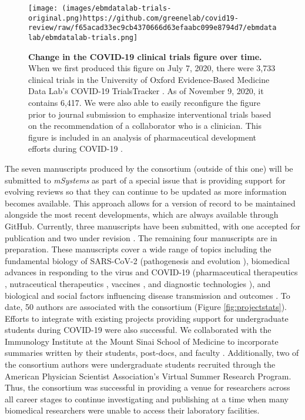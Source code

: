 \documentclass[sigconf]{acmart}
\begin{document}
\begin{figure}
\hypertarget{fig:ebm-trials}{%
\centering
\texttt{[image: (images/ebmdatalab-trials-original.png)https://github.com/greenelab/covid19-review/raw/f65acad33ec9cb4370666d63efaabc099e8794d7/ebmdatalab/ebmdatalab-trials.png]}
\caption{\textbf{Change in the COVID-19 clinical trials figure over time.}
When we first produced this figure on July 7, 2020, there were 3,733 clinical trials in the University of Oxford Evidence-Based Medicine Data Lab's COVID-19 TrialsTracker \citep{SSbnPnzT}.
As of November 9, 2020, it contains 6,417.
We were also able to easily reconfigure the figure prior to journal submission to emphasize interventional trials based on the recommendation of a collaborator who is a clinician.
This figure is included in an analysis of pharmaceutical development efforts during COVID-19 \citep{cifK9B8t}.}\label{fig:ebm-trials}
}
\end{figure}

The seven manuscripts produced by the consortium (outside of this one) will be submitted to \emph{mSystems} as part of a special issue that is providing support for evolving reviews so that they can continue to be updated as more information becomes available.
This approach allows for a version of record to be maintained alongside the most recent developments, which are always available through GitHub.
Currently, three manuscripts have been submitted, with one accepted for publication \citep{1B22G6dja} and two under revision \citep{r366f5T3, cifK9B8t}.
The remaining four manuscripts are in preparation.
These manuscripts cover a wide range of topics including the fundamental biology of SARS-CoV-2 (pathogenesis \citep{r366f5T3} and evolution \citep{17qiILENK}), biomedical advances in responding to the virus and COVID-19 (pharmaceutical therapeutics \citep{cifK9B8t}, nutraceutical therapeutics \citep{1B22G6dja}, vaccines \citep{i2CGFwI3}, and diagnostic technologies \citep{m8bOfc0M}), and biological and social factors influencing disease transmission and outcomes \citep{Up1vB19z}.
To date, 50 authors are associated with the consortium (Figure \ref{fig:projectstats}).
Efforts to integrate with existing projects providing support for undergraduate students during COVID-19 were also successful.
We collaborated with the Immunology Institute at the Mount Sinai School of Medicine to incorporate summaries written by their students, post-docs, and faculty \citep{cYo4O2qX, YZ4cHNuH}.
Additionally, two of the consortium authors were undergraduate students recruited through the American Physician Scientist Association's Virtual Summer Research Program.
Thus, the consortium was successful in providing a venue for researchers across all career stages to continue investigating and publishing at a time when many biomedical researchers were unable to access their laboratory facilities.
\end{document}
